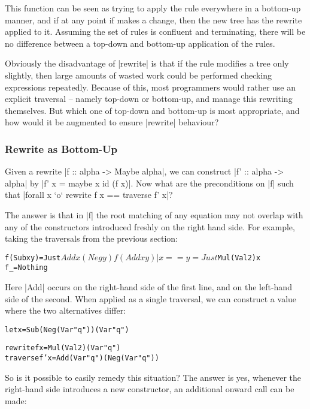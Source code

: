 \documentclass[preprint]{sigplanconf}
\newenvironment{code}{\begin{alltt}\small}{\end{alltt}}
\begin{document}
This function can be seen as trying to apply the rule everywhere in a bottom-up manner, and if at any point if makes a change, then the new tree has the rewrite applied to it. Assuming the set of rules is confluent and terminating, there will be no difference between a top-down and bottom-up application of the rules.

Obviously the disadvantage of |rewrite| is that if the rule modifies a tree only slightly, then large amounts of wasted work could be performed checking expressions repeatedly. Because of this, most programmers would rather use an explicit traversal -- namely top-down or bottom-up, and manage this rewriting themselves. But which one of top-down and bottom-up is most appropriate, and how would it be augmented to ensure |rewrite| behaviour?

\subsubsection{Rewrite as Bottom-Up}

Given a rewrite |f :: alpha -> Maybe alpha|, we can construct |f' :: alpha -> alpha| by |f' x = maybe x id (f x)|. Now what are the preconditions on |f| such that |forall x `o` rewrite f x == traverse f' x|?

The answer is that in |f| the root matching of any equation may not overlap with any of the constructors introduced freshly on the right hand side. For example, taking the traversals from the previous section:

\begin{code}
f (Sub x y)           = Just $ Add x (Neg y)
f (Add x y) | x == y  = Just $ Mul (Val 2) x
f _                   = Nothing
\end{code}

Here |Add| occurs on the right-hand side of the first line, and on the left-hand side of the second. When applied as a single traversal, we can construct a value where the two alternatives differ:

\begin{code}
let x = Sub (Neg (Var "q")) (Var "q")

rewrite   f   x = Mul (Val 2) (Var "q")
traverse  f'  x = Add (Var "q") (Neg (Var "q"))
\end{code}

So is it possible to easily remedy this situation? The answer is yes, whenever the right-hand side introduces a new constructor, an additional onward call can be made:
\end{document}
